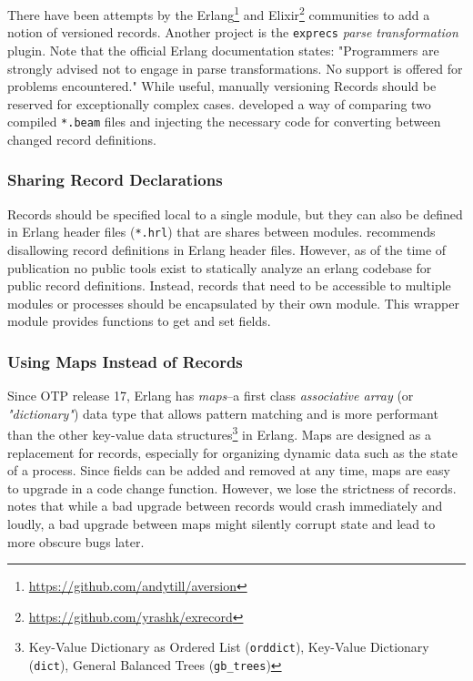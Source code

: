 There have been attempts by the Erlang\footnote{\url{https://github.com/andytill/aversion}} and Elixir\footnote{\url{https://github.com/yrashk/exrecord}} communities to add a notion of versioned records. Another project is the \lstinline|exprecs| \emph{parse transformation} plugin. Note that the official Erlang documentation states: "Programmers are strongly advised not to engage in parse transformations. No support is offered for problems encountered." While useful, manually versioning Records should be reserved for exceptionally complex cases. \cite{rebar3appup} developed a way of comparing two compiled \lstinline|*.beam| files and injecting the necessary code for converting between changed record definitions.

\subsubsection{Sharing Record Declarations}
Records should be specified local to a single module, but they can also be defined in Erlang header files (\lstinline|*.hrl|) that are shares between modules. \cite{davis:talk} recommends disallowing record definitions in Erlang header files. However, as of the time of publication no public tools exist to statically analyze an erlang codebase for public record definitions. Instead, records that need to be accessible to multiple modules or processes should be encapsulated by their own module. This wrapper module provides functions to get and set fields.

\subsubsection{Using Maps Instead of Records}
Since OTP release 17, Erlang has \emph{maps}--a first class \emph{associative array} (or \emph{"dictionary"}) data type that allows pattern matching and is more performant than the other key-value data structures\footnote{Key-Value Dictionary as Ordered List (\lstinline|orddict|), Key-Value Dictionary (\lstinline|dict|), General Balanced Trees (\lstinline|gb_trees|)} in Erlang. Maps are designed as a replacement for records, especially for organizing dynamic data such as the state of a process. Since fields can be added and removed at any time, maps are easy to upgrade in a code change function. However, we lose the strictness of records. \cite{ferd} notes that while a bad upgrade between records would crash immediately and loudly, a bad upgrade between maps might silently corrupt state and lead to more obscure bugs later.


